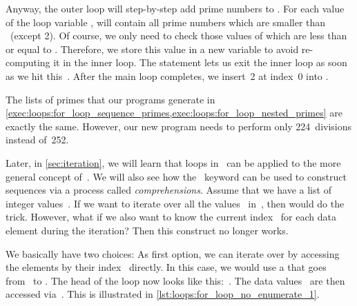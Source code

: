 Anyway, the outer loop will step-by-step add prime numbers to .
For each value of the loop variable ,  will contain all prime numbers which are smaller than ~(except 2).
Of course, we only need to check those values of  which are less than or equal to .
Therefore, we store this value in a new variable  to avoid re-computing it in the inner loop.
The  statement lets us exit the inner loop as soon as we hit this~.
After the main loop completes, we insert~2 at index~0 into .

The lists of primes that our programs generate in \cref{exec:loops:for_loop_sequence_primes,exec:loops:for_loop_nested_primes} are exactly the same.
However, our new program needs to perform only 224~divisions instead of~252.

Later, in \cref{sec:iteration}, we will learn that loops in \python\ can be applied to the more general concept of~.
We will also see how the ~keyword can be used to construct sequences via a process called \emph{comprehensions}.%
%
\FloatBarrier%
\endhsection%
%
%
\label{sec:enumOverSequences}%
%
%
%
%
%
%
%
Assume that we have a list  of integer values~.
If we want to iterate over all the values~ in~, then  would do the trick.
However, what if we also want to know the current index~ for each data element during the iteration?
Then this construct no longer works.

We basically have two choices:
As first option, we can iterate over  by accessing the elements by their index~ directly.
In this case, we would use a  that goes from~ to .
The head of the loop now looks like this:~.
The data values~ are then accessed via~.
This is illustrated in \cref{lst:loops:for_loop_no_enumerate_1}.


